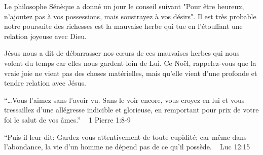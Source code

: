 Le philosophe Sénèque a donné un jour le conseil suivant "Pour être heureux, n'ajoutez pas à vos possessions, mais soustrayez à vos désirs". Il est très probable notre poursuite des richesses est la mauvaise herbe qui tue en l'étouffant une relation joyeuse avec Dieu.

Jésus nous a dit de débarrasser nos cœurs de ces mauvaises herbes qui nous volent du temps car elles nous gardent loin de Lui. Ce Noël, rappelez-vous que la vraie joie ne vient pas des choses matérielles, mais qu'elle vient d'une profonde et tendre relation avec Jésus.


“…Vous l’aimez sans l’avoir vu. Sans le voir encore, vous croyez en lui et vous tressaillez d’une allégresse indicible et glorieuse, en remportant pour prix de votre foi le salut de vos âmes.”  ~ 1 Pierre 1:8-9

“Puis il leur dit: Gardez-vous attentivement de toute cupidité; car même dans l’abondance, la vie d’un homme ne dépend pas de ce qu’il possède.  ~ Luc 12:15

